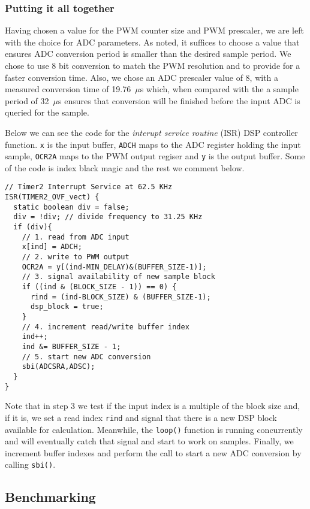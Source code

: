 \subsubsection{Putting it all together}

Having chosen a value for the PWM counter size and PWM prescaler, we are left
with the choice for ADC parameters. As noted, it suffices to choose a value
that ensures ADC conversion period is smaller than the desired sample period.
We chose to use 8 bit conversion to match the PWM resolution and to provide for
a faster conversion time. Also, we chose an ADC prescaler value of 8, with a
measured conversion time of 19.76~$\mu$s which, when compared with the
a sample period of 32~$\mu$s ensures that conversion will be finished before
the input ADC is queried for the sample.

Below we can see the code for the \emph{interupt service routine} (ISR) DSP controller function. \texttt{x} is the input buffer, \texttt{ADCH} maps to the ADC register holding the input sample, \texttt{OCR2A} maps to the PWM output regiser and \texttt{y} is the output buffer. Some of the code is index black magic and the rest we comment below.

\begin{lstlisting}
// Timer2 Interrupt Service at 62.5 KHz
ISR(TIMER2_OVF_vect) {
  static boolean div = false;
  div = !div; // divide frequency to 31.25 KHz
  if (div){
    // 1. read from ADC input
    x[ind] = ADCH;
    // 2. write to PWM output
    OCR2A = y[(ind-MIN_DELAY)&(BUFFER_SIZE-1)];
    // 3. signal availability of new sample block
    if ((ind & (BLOCK_SIZE - 1)) == 0) {
      rind = (ind-BLOCK_SIZE) & (BUFFER_SIZE-1);
      dsp_block = true;
    }
    // 4. increment read/write buffer index
    ind++;
    ind &= BUFFER_SIZE - 1;
    // 5. start new ADC conversion
    sbi(ADCSRA,ADSC);
  }
} 
\end{lstlisting}

Note that in step 3 we test if the input index is a multiple of the block size and, if it is, we set a read index \texttt{rind} and signal that there is a new DSP block available for calculation. Meanwhile, the \texttt{loop()} function is running concurrently and will eventually catch that signal and start to work on samples. Finally, we increment buffer indexes and perform the call to start a new ADC conversion by calling \texttt{sbi()}.

\subsection{Benchmarking}


